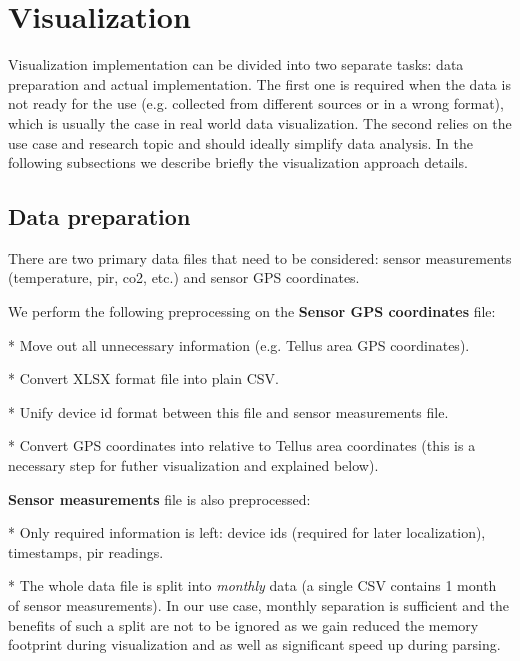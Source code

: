\documentclass{article}
\title{
Exercise 2: IoT Data Analytics
\bigskip
\author{Andrei Golubev 2621924 \\ Hassan Shaheen 2600602}
\date{\parbox{\linewidth}{\centering
  \endgraf\bigskip
  University of Oulu, Oulu, Finland
  \endgraf\monthyeardate\today}}
}
\begin{document}
\maketitle
\thispagestyle{empty}
\newpage

\section{Visualization}

Visualization implementation can be divided into two separate tasks: data preparation and actual
implementation. The first one is required when the data is not ready for the use (e.g. collected
from different sources or in a wrong format), which is usually the case in real world data
visualization. The second relies on the use case and research topic and should ideally simplify data
analysis. In the following subsections we describe briefly the visualization approach details.

\subsection{Data preparation}

There are two primary data files that need to be considered: sensor measurements (temperature, pir,
co2, etc.) and sensor GPS coordinates.

We perform the following preprocessing on the \textbf{Sensor GPS coordinates} file:

* Move out all unnecessary information (e.g. Tellus area GPS coordinates).

* Convert XLSX format file into plain CSV.

* Unify device id format between this file and sensor measurements file.

* Convert GPS coordinates into relative to Tellus area coordinates (this is a necessary step for
futher visualization and explained below).

\textbf{Sensor measurements} file is also preprocessed:

* Only required information is left: device ids (required for later localization), timestamps, pir
readings.

* The whole data file is split into \textit{monthly} data (a single CSV contains 1 month of sensor
measurements). In our use case, monthly separation is sufficient and the benefits of such a split
are not to be ignored as we gain reduced the memory footprint during visualization and as well as
significant speed up during parsing.
\end{document}
